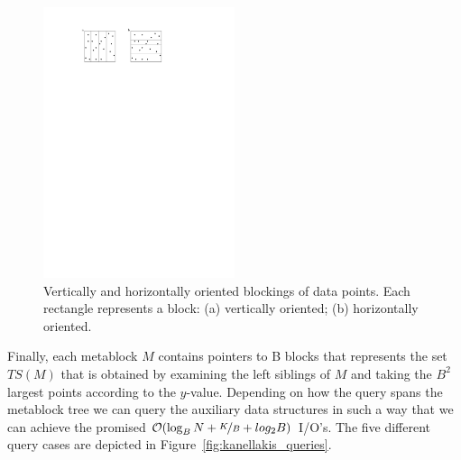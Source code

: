 \documentclass[twoside,11pt,openright]{report}
\begin{document}
\begin{figure}[h]
	\centering
		\includegraphics[width=0.5\textwidth]{../figures/kanellakis_vertical_horizontally_oriented_blocks}
	\caption{Vertically and horizontally oriented blockings of data points. Each rectangle represents a block: (a) vertically oriented; (b) horizontally oriented.}
	\label{fig:kanellakis_vertical_horizontally_oriented_blocks}
\end{figure}

Finally, each metablock $M$ contains pointers to B blocks that represents the set $TS(M)$ that is obtained by examining the left siblings of $M$ and taking the $B^2$ largest points according to the $y$-value. Depending on how the query spans the metablock tree we can query the auxiliary data structures in such a way that we can achieve the promised $\mathcal{O}(\log_B N + \nicefrac{K}{B} + log_2 B)$ I/O's. The five different query cases are depicted in Figure~\ref{fig:kanellakis_queries}.
\end{document}

